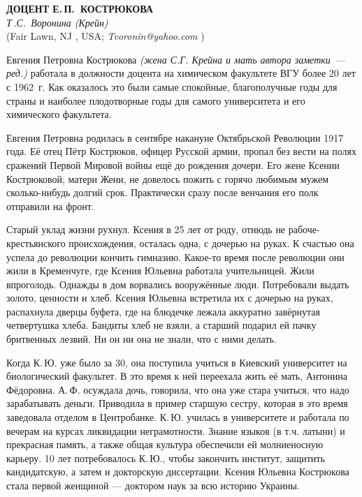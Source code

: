\begin{center}{ \bf ДОЦЕНТ Е.\,П.~КОСТРЮКОВА}\\
{\it Т\,.С.~Воронина (Крейн)} \\
(Fair Lawn, NJ , USA; {\it Tvoronin@yahoo.com} )
\end{center}
Евгения Петровна Кострюкова
\textit{(жена С.Г. Крейна и мать автора заметки~--- ред.)}
работала в должности доцента на химическом факультете ВГУ более 20 лет с 1962~г.
Как оказалось это были самые спокойные, благополучные годы для страны и наиболее плодотворные годы для самого университета и его химического факультета.

Евгения Петровна родилась в сентябре накануне Ок\-тяб\-рь\-с\-кой Революции 1917 года.
Её отец Пётр Кострюков, офицер Русской армии, пропал без вести на полях сражений Первой Мировой войны ещё до рождения дочери. Его жене Ксении Кострюковой, матери Жени, не довелось пожить с горячо любимым мужем сколько-нибудь долгий срок. Практически сразу после венчания его полк отправили на фронт.

Старый уклад жизни рухнул. Ксения в 25 лет от роду, отнюдь не рабоче-крестьянского происхождения, осталась одна, с дочерью на руках. К счастью она успела до революции кончить гимназию. Какое-то время после революции они жили в Кременчуге, где Ксения Юльевна работала учительницей. Жили впроголодь. Однажды в дом ворвались вооружённые люди. Потребовали выдать золото, ценности и хлеб. Ксения Юльевна встретила их с дочерью на руках, распахнула дверцы буфета, где на блюдечке лежала аккуратно завёрнутая четвертушка хлеба. Бандиты хлеб не взяли, а старший подарил ей пачку бритвенных лезвий. Ни он ни она не знали, что с ними делать.

Когда К.\,Ю. уже было за 30, она поступила учиться в Киевский университет на биологический факультет. В это время к ней переехала жить её мать, Антонина Фёдоровна. А.\,Ф. осуждала дочь, говорила, что она уже стара учиться, что надо зарабатывать деньги. Приводила в пример старшую сестру, которая в это время заведовала отделом в Центробанке. К.\,Ю. училась в университете и работала по вечерам на курсах ликвидации неграмотности. Знание языков (в т.ч. латыни) и прекрасная память, а также общая культура обеспечили ей молниеносную карьеру. 10 лет потребовалось К.\,Ю., чтобы закончить институт, защитить кандидатскую, а затем и докторскую диссертации. Ксения Юльевна Кострюкова стала первой женщиной --- доктором наук за всю историю Украины.

